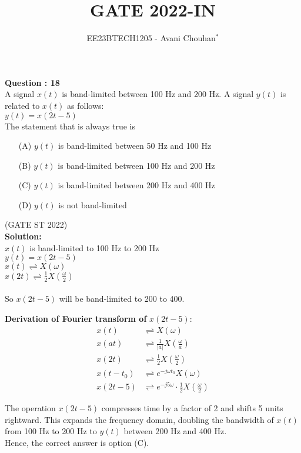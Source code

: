 \documentclass[journal,12pt,twocolumn]{IEEEtran}
\theoremstyle{remark}
\begin{document}

\vspace{3cm}

\title{GATE 2022-IN}
\author{EE23BTECH1205 - Avani Chouhan$^{*}$}
\maketitle
\newpage
\bigskip

\renewcommand{\thefigure}{\theenumi}
\renewcommand{\thetable}{\theenumi}

\vspace{3cm}
\textbf{Question : 18} \\
A signal \( x(t) \) is band-limited between 100 Hz and 200 Hz. A signal \( y(t) \) is related to \( x(t) \) as follows:\\

\( y(t) = x(2t - 5) \)\\
The statement that is always true is \\

\begin{enumerate}
  \item[(A)] \( y(t) \) is band-limited between 50 Hz and 100 Hz
  \item[(B)] \( y(t) \) is band-limited between 100 Hz and 200 Hz
  \item[(C)] \( y(t) \) is band-limited between 200 Hz and 400 Hz
  \item[(D)] \( y(t) \) is not band-limited 
\end{enumerate}

\hfill{(GATE ST 2022)}\\
\textbf{Solution:} \\

\( x(t) \) is band-limited to 100 Hz to 200 Hz \\
$y(t) = x(2t - 5)$ \\
$x(t) \rightleftharpoons X(\omega)$ \\
$x(2t) \rightleftharpoons \frac{1}{2} X\left(\frac{\omega}{2}\right)$ \\
 \\
So \( x(2t - 5) \) will be band-limited to 200 to 400.

\hspace{-3em}\textbf{Derivation of Fourier transform of } $x(2t-5)$:
\begin{align}
x(t) &\rightleftharpoons X(\omega) \nonumber \\
x(at) &\rightleftharpoons \frac{1}{|a|} X\left(\frac{\omega}{a}\right) \nonumber \\
x(2t) &\rightleftharpoons \frac{1}{2} X\left(\frac{\omega}{2}\right) \nonumber \\
x(t - t_0) &\rightleftharpoons e^{-j\omega t_0}X(\omega) \nonumber \\
x(2t - 5) &\rightleftharpoons e^{-j5\omega} \cdot \frac{1}{2} X\left(\frac{\omega}{2}\right) \nonumber 
\end{align}

The operation \(x(2t-5)\) compresses time by a factor of 2 and shifts 5 units rightward. This expands the frequency domain, doubling the bandwidth of \(x(t)\) from 100 Hz to 200 Hz to \(y(t)\) between 200 Hz and 400 Hz.\\

Hence, the correct answer is option (C).
\end{document}
